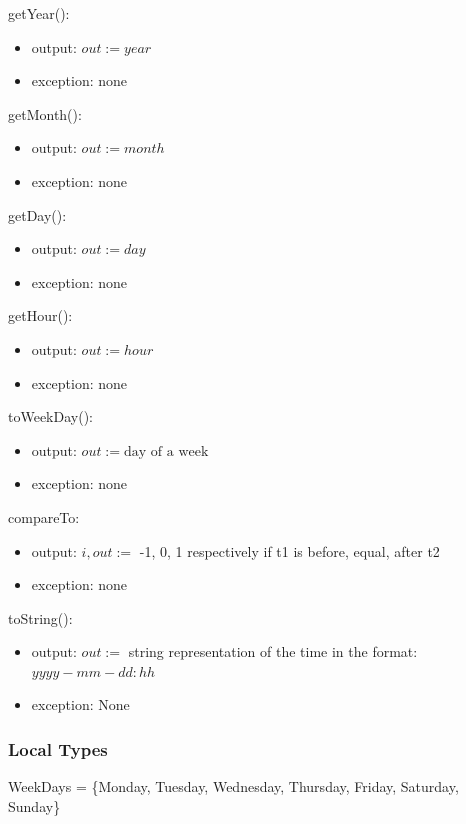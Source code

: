 \documentclass[12pt]{article}
\begin{document}
\noindent getYear():
\begin{itemize}
\item output: $out := year$
\item exception: none
\end{itemize}

\noindent getMonth():
\begin{itemize}
\item output: $out := month$
\item exception: none
\end{itemize}

\noindent getDay():
\begin{itemize}
\item output: $out := day$
\item exception: none
\end{itemize}

\noindent getHour():
\begin{itemize}
\item output: $out := hour$
\item exception: none
\end{itemize}


\noindent toWeekDay():
\begin{itemize}
\item output: $out := \text{day of a week}$
\item exception: none
\end{itemize}


\noindent compareTo:
\begin{itemize}
\item output: $i, out := $ -1, 0, 1 respectively if t1 is before, equal, after t2
\item exception: none
\end{itemize}

\noindent toString():
\begin{itemize}
\item output: $out := $ string representation of the time in the format: $yyyy-mm-dd:hh$
\item exception: None
\end{itemize}

\subsubsection* {Local Types}
WeekDays = \{Monday, Tuesday, Wednesday, Thursday, Friday, Saturday, Sunday\}\\
\end{document}
